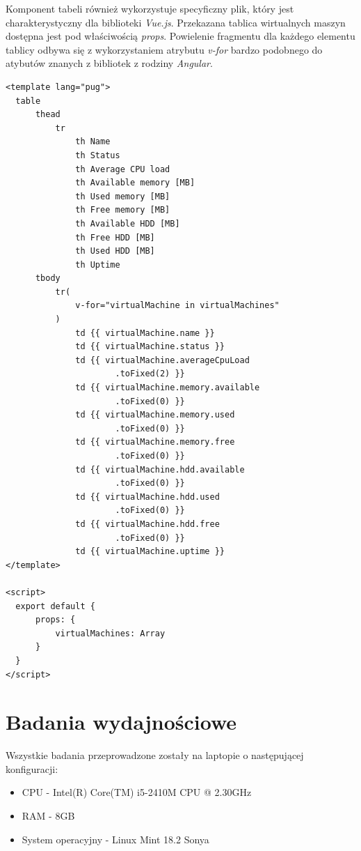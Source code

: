 \documentclass[polish, twoside, 12pt]{mwart}
\let\stdsection\section
\renewcommand*{\section}{\clearpage\stdsection}
\begin{document}
Komponent tabeli również wykorzystuje specyficzny plik, który jest charakterystyczny dla biblioteki \emph{Vue.js}. Przekazana tablica wirtualnych maszyn dostępna jest pod właściwością \emph{props}. Powielenie fragmentu dla każdego elementu tablicy odbywa się z wykorzystaniem atrybutu \emph{v-for} bardzo podobnego do atybutów znanych z bibliotek z rodziny \emph{Angular}.

\begin{lstlisting}[caption=Komponent tabeli]
<template lang="pug">
  table
      thead
          tr
              th Name
              th Status
              th Average CPU load
              th Available memory [MB]
              th Used memory [MB]
              th Free memory [MB]
              th Available HDD [MB]
              th Free HDD [MB]
              th Used HDD [MB]
              th Uptime
      tbody
          tr(
              v-for="virtualMachine in virtualMachines"
          )
              td {{ virtualMachine.name }}
              td {{ virtualMachine.status }}
              td {{ virtualMachine.averageCpuLoad
                      .toFixed(2) }}
              td {{ virtualMachine.memory.available
                      .toFixed(0) }}
              td {{ virtualMachine.memory.used
                      .toFixed(0) }}
              td {{ virtualMachine.memory.free
                      .toFixed(0) }}
              td {{ virtualMachine.hdd.available
                      .toFixed(0) }}
              td {{ virtualMachine.hdd.used
                      .toFixed(0) }}
              td {{ virtualMachine.hdd.free
                      .toFixed(0) }}
              td {{ virtualMachine.uptime }}
</template>

<script>
  export default {
      props: {
          virtualMachines: Array
      }
  }
</script>
\end{lstlisting}

\section{Badania wydajnościowe}

Wszystkie badania przeprowadzone zostały na laptopie o następującej konfiguracji:

\begin{itemize}
  \item CPU - Intel(R) Core(TM) i5-2410M CPU @ 2.30GHz
  \item RAM - 8GB
  \item System operacyjny - Linux Mint 18.2 Sonya
\end{itemize}
\end{document}
